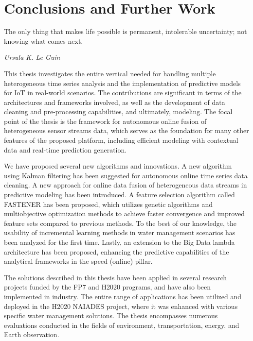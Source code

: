 % 
\chapter{Conclusions and Further Work}
\label{ch:conclusion}

\epigraph{The only thing that makes life possible is permanent, intolerable uncertainty; not knowing what comes next.}{\textit{Ursula K. Le Guin}}

This thesis investigates the entire vertical needed for handling multiple heterogeneous time series analysis and the implementation of predictive models for IoT in real-world scenarios.
The contributions are significant in terms of the architectures and frameworks involved, as well as the development of data cleaning and pre-processing capabilities, and ultimately, modeling. 
The focal point of the thesis is the framework for autonomous online fusion of heterogeneous sensor streams data, which serves as the foundation for many other features of the proposed platform, including efficient modeling with contextual data and real-time prediction generation.

We have proposed several new algorithms and innovations.
A new algorithm using Kalman filtering has been suggested for autonomous online time series data cleaning. 
A new approach for online data fusion of heterogeneous data streams in predictive modeling has been introduced. 
A feature selection algorithm called FASTENER has been proposed, which utilizes genetic algorithms and multiobjective optimization methods to achieve faster convergence and improved feature sets compared to previous methods.
To the best of our knowledge, the usability of incremental learning methods in water management scenarios has been analyzed for the first time. 
Lastly, an extension to the Big Data lambda architecture has been proposed, enhancing the predictive capabilities of the analytical frameworks in the speed (online) pillar.

The solutions described in this thesis have been applied in several research projects funded by the FP7 and H2020 programs, and have also been implemented in industry. 
The entire range of applications has been utilized and deployed in the H2020 NAIADES project, where it was enhanced with various specific water management solutions. 
The thesis encompasses numerous evaluations conducted in the fields of environment, transportation, energy, and Earth observation.

